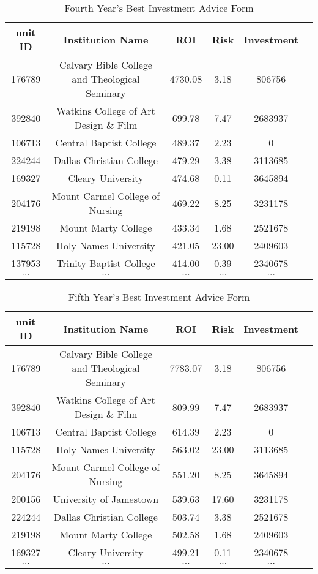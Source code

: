\documentclass{mcmthesis}
\begin{document}
\begin{table}[h]
\centering
\caption{Fourth Year's Best Investment Advice Form}
\label{tab:Fourth Year's Best Investment Advice Form}
\begin{tabular}{cccccc}
\toprule
unit ID &	 Institution Name &	ROI & Risk	& Investment\\
\midrule
176789&	Calvary Bible College and Theological Seminary&	4730.08&	3.18&	806756\\
392840&	Watkins College of Art Design \& Film&	699.78&	7.47&	2683937\\
106713&	Central Baptist College&	489.37&	2.23&	0\\
224244&	Dallas Christian College&	479.29&	3.38&	3113685\\
169327&	Cleary University&	474.68&	0.11&	3645894\\
204176&	Mount Carmel College of Nursing&	469.22&	8.25&	3231178\\
219198&	Mount Marty College&	433.34&	1.68&	2521678\\
115728&	Holy Names University&	421.05&	23.00&	2409603\\
137953&	Trinity Baptist College&	414.00&	0.39&	2340678\\
$\cdots$&$\cdots$&$\cdots$&$\cdots$&$\cdots$\\
\bottomrule
\end{tabular}
\end{table}


\begin{table}[h]
\centering
\caption{Fifth Year's Best Investment Advice Form}
\label{tab:Fifth Year's Best Investment Advice Form}
\begin{tabular}{cccccc}
\toprule
unit ID &	 Institution Name &	ROI & Risk	& Investment\\
\midrule
176789&	Calvary Bible College and Theological Seminary&	7783.07&	3.18&	806756\\
392840&	Watkins College of Art Design \& Film&	809.99&	7.47&	2683937\\
106713&	Central Baptist College&	614.39&	2.23&	0\\
115728&	Holy Names University&	563.02&	23.00&	3113685\\
204176&	Mount Carmel College of Nursing&	551.20&	8.25&	3645894\\
200156&	University of Jamestown&	539.63&	17.60&	3231178\\
224244&	Dallas Christian College&	503.74&	3.38&	2521678\\
219198&	Mount Marty College&	502.58&	1.68&	2409603\\
169327&	Cleary University&	499.21&	0.11&	2340678\\
$\cdots$&$\cdots$&$\cdots$&$\cdots$&$\cdots$\\
\bottomrule
\end{tabular}
\end{table}
\end{document}
